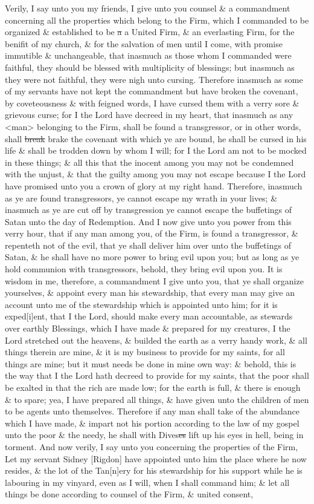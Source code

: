 					Verily, I say unto you my friends, I give unto you counsel \& a commandment concerning all the properties which belong to the Firm, which I commanded to be organized \& established to be \sout{a} a United Firm, \& an everlasting Firm, for the benifit of my church, \& for the salvation of men until I come, with promise immutible \& unchangeable, that inasmuch as those whom I commanded were faithful, they should be blessed with multiplicity of blessings; but inasmuch as they were not faithful, they were nigh unto cursing. Therefore inasmuch as some of my servants have not kept the commandment but have broken the covenant, by coveteousness \& with feigned words, I have cursed them with a verry sore \& grievous curse; for I the Lord have decreed in my heart, that inasmuch as any <man> belonging to the Firm, shall be found a transgressor, or in other words, shall \sout{break} brake the covenant with which ye are bound, he shall be cursed in his life \& shall be trodden down by whom I will; for I the Lord am not to be mocked in these things; \& all this that the inocent among you may not be condemned with the unjust, \& that the guilty among you may not escape because I the Lord have promised unto you a crown of glory at my right hand. Therefore, inasmuch as ye are found transgressors, ye cannot escape my wrath in your lives; \& inasmuch as ye are cut off by transgression ye cannot escape the buffetings of Satan unto the day of Redemption. And I now give unto you power from this verry hour, that if any man among you, of the Firm, is found a transgressor, \& repenteth not of the evil, that ye shall deliver him over unto the buffetings of Satan, \& he shall have no more power to bring evil upon you; but as long as ye hold communion with transgressors, behold, they bring evil upon you. It is wisdom in me, therefore, a commandment I give unto you, that ye shall organize yourselves, \& appoint every man his stewardship, that every man may give an account unto me of the stewardship which is appointed unto him; for it is exped[i]ent, that I the Lord, should make every man accountable, as stewards over earthly Blessings, which I have made \& prepared for my creatures, I the Lord stretched out the heavens, \& builded the earth as a verry handy work, \& all things therein are mine, \& it is my business to provide for my saints, for all things are mine; but it must needs be done in mine own way: \& behold, this is the way that I the Lord hath decreed to provide for my saints, that the poor shall be exalted in that the rich are made low; for the earth is full, \& there is enough \& to spare; yea, I have prepared all things, \& have given unto the children of men to be agents unto themselves. Therefore if any man shall take of the abundance which I have made, \& impart not his portion according to the law of my gospel unto the poor \& the needy, he shall with Dives\sout{es} lift up his eyes in hell, being in torment. And now verily, I say unto you concerning the properties of the Firm, Let my servant Sidney [Rigdon] have appointed unto him the place where he now resides, \& the lot of the Tan[n]ery for his stewardship for his support while he is labouring in my vinyard, even as I will, when I shall command him; \& let all things be done according to counsel of the Firm, \& united consent, 